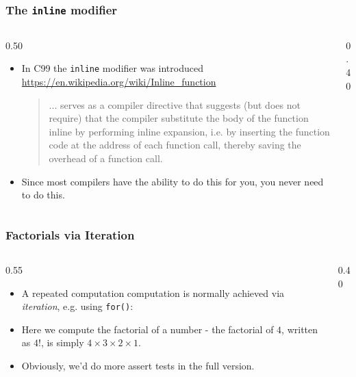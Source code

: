 \begin{frame}[fragile]
\frametitle{The {\tt inline} modifier}
\begin{columns}

\begin{column}{0.50\textwidth}
\begin{itemize}[<+->]
\item In C99 the {\tt inline} modifier was introduced
\url{https://en.wikipedia.org/wiki/Inline_function}
\begin{quote}
... serves as a compiler directive that suggests (but does not
require) that the compiler substitute the body of the function inline by
performing inline expansion, i.e. by inserting the function code at the
address of each function call, thereby saving the overhead of a function
call.
\end{quote}
\item Since most compilers have the ability to do this for you, you never need to do this.
\end{itemize}
\end{column}

\begin{column}{0.40\textwidth}

\end{column}

\end{columns}
\end{frame}


\begin{frame}[fragile]
\frametitle{Factorials via Iteration}
\begin{columns}

\begin{column}{0.55\textwidth}
\begin{itemize}[<+->]
\item A repeated computation computation is normally
achieved via {\it iteration}, e.g. using \verb^for()^:
\item Here we compute the factorial of a number - the factorial of
$4$, written as $4!$, is simply $4\times3\times2\times1$.
\item Obviously, we'd do more assert tests in the full version.
\end{itemize}
\end{column}

\pause
\begin{column}{0.40\textwidth}

\end{column}

\end{columns}
\end{frame}

